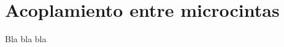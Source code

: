 \section{Acoplamiento entre microcintas}%
\label{sec:acoplamiento_entre_microcintas}

Bla bla bla


